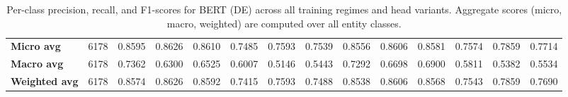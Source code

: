 \documentclass[11pt,a4paper,twocolumn]{article}
\begin{document}
\begin{table}[t]
\begin{tabular}{l r ccc ccc ccc ccc}
\midrule
\textbf{Micro avg}    & 6178 & 0.8595 & 0.8626 & 0.8610 & 0.7485 & 0.7593 & 0.7539 & 0.8556 & 0.8606 & 0.8581 & 0.7574 & 0.7859 & 0.7714 \\
\textbf{Macro avg}    & 6178 & 0.7362 & 0.6300 & 0.6525 & 0.6007 & 0.5146 & 0.5443 & 0.7292 & 0.6698 & 0.6900 & 0.5811 & 0.5382 & 0.5534 \\
\textbf{Weighted avg} & 6178 & 0.8574 & 0.8626 & 0.8592 & 0.7415 & 0.7593 & 0.7488 & 0.8538 & 0.8606 & 0.8568 & 0.7543 & 0.7859 & 0.7690 \\
\bottomrule
\end{tabular}
\caption{Per-class precision, recall, and F1-scores for BERT (DE) across all training regimes and head variants. Aggregate scores (micro, macro, weighted) are computed over all entity classes.}
\label{tab:appendix-bert-de-classification}
\end{table}
\end{document}
